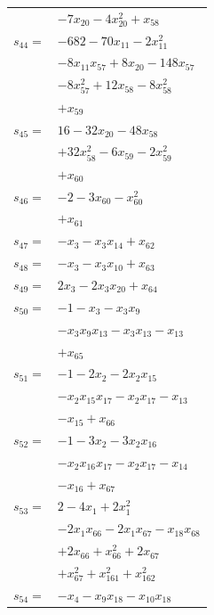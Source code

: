 \begin{longtable}{@{}r@{\;}l@{}}
 & \(\displaystyle -7x_{20} -4x_{20}^{2} +x_{58}\) \\[3pt]
\(s_{44}=\) & \(\displaystyle -682 -70x_{11} -2x_{11}^{2}\) \\
 & \(\displaystyle -8x_{11}x_{57} +8x_{20} -148x_{57}\) \\
 & \(\displaystyle -8x_{57}^{2} +12x_{58} -8x_{58}^{2}\) \\
 & \(\displaystyle +x_{59}\) \\[3pt]
\(s_{45}=\) & \(\displaystyle 16 -32x_{20} -48x_{58}\) \\
 & \(\displaystyle +32x_{58}^{2} -6x_{59} -2x_{59}^{2}\) \\
 & \(\displaystyle +x_{60}\) \\[3pt]
\(s_{46}=\) & \(\displaystyle -2 -3x_{60} -x_{60}^{2}\) \\
 & \(\displaystyle +x_{61}\) \\[3pt]
\(s_{47}=\) & \(\displaystyle -x_{3} -x_{3}x_{14} +x_{62}\) \\[3pt]
\(s_{48}=\) & \(\displaystyle -x_{3} -x_{3}x_{10} +x_{63}\) \\[3pt]
\(s_{49}=\) & \(\displaystyle 2x_{3} -2x_{3}x_{20} +x_{64}\) \\[3pt]
\(s_{50}=\) & \(\displaystyle -1 -x_{3} -x_{3}x_{9}\) \\
 & \(\displaystyle -x_{3}x_{9}x_{13} -x_{3}x_{13} -x_{13}\) \\
 & \(\displaystyle +x_{65}\) \\[3pt]
\(s_{51}=\) & \(\displaystyle -1 -2x_{2} -2x_{2}x_{15}\) \\
 & \(\displaystyle -x_{2}x_{15}x_{17} -x_{2}x_{17} -x_{13}\) \\
 & \(\displaystyle -x_{15} +x_{66}\) \\[3pt]
\(s_{52}=\) & \(\displaystyle -1 -3x_{2} -3x_{2}x_{16}\) \\
 & \(\displaystyle -x_{2}x_{16}x_{17} -x_{2}x_{17} -x_{14}\) \\
 & \(\displaystyle -x_{16} +x_{67}\) \\[3pt]
\(s_{53}=\) & \(\displaystyle 2 -4x_{1} +2x_{1}^{2}\) \\
 & \(\displaystyle -2x_{1}x_{66} -2x_{1}x_{67} -x_{18}x_{68}\) \\
 & \(\displaystyle +2x_{66} +x_{66}^{2} +2x_{67}\) \\
 & \(\displaystyle +x_{67}^{2} +x_{161}^{2} +x_{162}^{2}\) \\[3pt]
\(s_{54}=\) & \(\displaystyle -x_{4} -x_{9}x_{18} -x_{10}x_{18}\) \\

\end{longtable}
